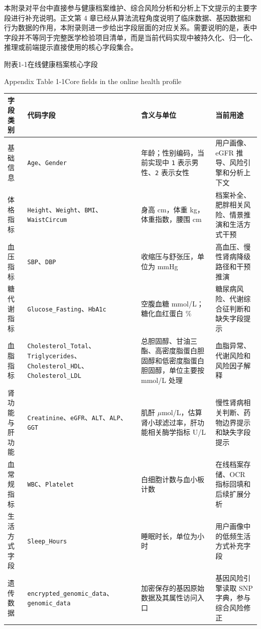 \documentclass[UTF8, a4paper, 12pt, oneside]{ctexrep}
\numberwithin{equation}{chapter}
\newcommand{\codeid}[1]{{\begingroup\urlstyle{rm}\nolinkurl{#1}\endgroup}}
\begin{document}
{
\songti{}
\onehalfspacing
\noindent 本附录对平台中直接参与健康档案维护、综合风险分析和分析上下文提示的主要字段进行补充说明。正文第 4 章已经从算法流程角度说明了临床数据、基因数据和行为数据的作用，本附录则进一步给出字段层面的对应关系。需要说明的是，表中字段并不等同于完整医学检验项目清单，而是当前代码实现中被持久化、归一化、推理或前端提示直接使用的核心字段集合。

\vspace{0.5\baselineskip}
\begin{center}
{\songti{}附表1-1\quad 在线健康档案核心字段\par}
{\rmfamily{}Appendix Table 1-1\quad Core fields in the online health profile\par}
\end{center}
\vspace{-0.5\baselineskip}
{\songti{}
\noindent\begin{tabular}{@{}>{\raggedright\arraybackslash}p{} >{\raggedright\arraybackslash}p{} >{\raggedright\arraybackslash}p{} >{\raggedright\arraybackslash}p{}@{}}
\toprule
字段类别 & 代码字段 & 含义与单位 & 当前用途 \\
\midrule
基础信息 & \codeid{Age}、\codeid{Gender} & 年龄；性别编码，当前实现中 \codeid{1} 表示男性、\codeid{2} 表示女性 & 用户画像、eGFR 推导、风险引擎和分析上下文 \\
体格指标 & \codeid{Height}、\codeid{Weight}、\codeid{BMI}、\codeid{WaistCircum} & 身高 cm，体重 kg，体重指数，腰围 cm & 档案补全、肥胖相关风险、情景推演和生活方式干预 \\
血压指标 & \codeid{SBP}、\codeid{DBP} & 收缩压与舒张压，单位为 mmHg & 高血压、慢性肾病降级路径和干预推演 \\
糖代谢指标 & \codeid{Glucose_Fasting}、\codeid{HbA1c} & 空腹血糖 mmol/L；糖化血红蛋白 \(\%\) & 糖尿病风险、代谢综合征判断和缺失字段提示 \\
血脂指标 & \codeid{Cholesterol_Total}、\codeid{Triglycerides}、\codeid{Cholesterol_HDL}、\codeid{Cholesterol_LDL} & 总胆固醇、甘油三酯、高密度脂蛋白胆固醇和低密度脂蛋白胆固醇，单位主要按 mmol/L 处理 & 血脂异常、代谢风险和风险因子解释 \\
肾功能与肝功能 & \codeid{Creatinine}、\codeid{eGFR}、\codeid{ALT}、\codeid{ALP}、\codeid{GGT} & 肌酐 \(\mu\)mol/L，估算肾小球滤过率，肝功能相关酶学指标 U/L & 慢性肾病相关判断、药物边界提示和缺失字段提示 \\
血常规指标 & \codeid{WBC}、\codeid{Platelet} & 白细胞计数与血小板计数 & 在线档案存储、OCR 指标回填和后续扩展分析 \\
生活方式字段 & \codeid{Sleep_Hours} & 睡眠时长，单位为小时 & 用户画像中的低频生活方式补充字段 \\
遗传数据 & \codeid{encrypted_genomic_data}、\codeid{genomic_data} & 加密保存的基因原始数据及其属性访问入口 & 基因风险引擎读取 SNP 字典，参与综合风险修正 \\
\bottomrule
\end{tabular}
}

}
\end{document}
